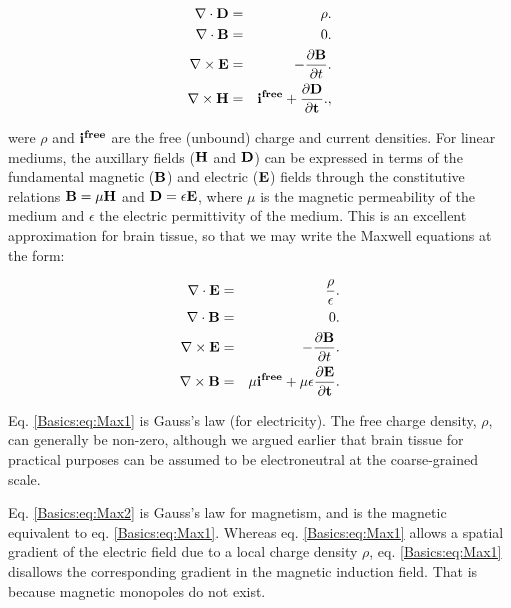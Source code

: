 \begin{eqnarray}
\nabla\cdot {\bf D} & = & \rho. \label{Basics:eq:Max11} \\
\nabla \cdot {\bf B} & = & 0.  \label{Basics:eq:Max22} \\
\nabla \times {\bf E} & = & - \frac{\partial {\bf B}}{\partial t}.  \label{Basics:eq:Max33} \\
\nabla \times {\bf H} & = & \bf{i^{free}} + \frac{\partial {\bf D}}{\partial t}.  \label{Basics:eq:Max44}, 
\end{eqnarray}

were $\rho$ and $\bf{i^{free}}$ are the free (unbound) charge and current densities. For linear mediums, the auxillary fields (${\bf H}$ and ${\bf D}$) can be expressed in terms of the fundamental magnetic (${\bf B}$) and electric (${\bf E}$) fields through the constitutive relations ${\bf B} = \mu{\bf H}$ and ${\bf D} = \epsilon {\bf E}$, where $\mu$ is the magnetic permeability of the medium and $\epsilon$ the electric permittivity of the medium. This is an excellent approximation for brain tissue, so that we may write the Maxwell equations at the form:

\begin{eqnarray}
\nabla\cdot {\bf E} & = & \frac{\rho}{\epsilon}. \label{Basics:eq:Max1} \\
\nabla \cdot {\bf B} & = & 0.  \label{Basics:eq:Max2} \\
\nabla \times {\bf E} & = & - \frac{\partial {\bf B}}{\partial t}.  \label{Basics:eq:Max3} \\
\nabla \times {\bf B} & = & \mu\bf{i^{free}} + \mu\epsilon\frac{\partial {\bf E}}{\partial t}.  \label{Basics:eq:Max4}
\end{eqnarray}

Eq. \ref{Basics:eq:Max1} is Gauss's law (for electricity). The free charge density, $\rho$, can generally be non-zero, although we argued earlier that brain tissue for practical purposes can be assumed to be electroneutral at the coarse-grained scale. 

Eq. \ref{Basics:eq:Max2} is Gauss's law for magnetism, and is the magnetic equivalent to eq. \ref{Basics:eq:Max1}. Whereas eq. \ref{Basics:eq:Max1} allows a spatial gradient of the electric field due to a local charge density $\rho$, eq. \ref{Basics:eq:Max1} disallows the corresponding gradient in the magnetic induction field. That is because magnetic monopoles do not exist. 

